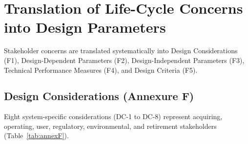 \section{Translation of Life-Cycle Concerns into Design Parameters}
\label{sec:F}

Stakeholder concerns are translated systematically into Design Considerations (F1), Design-Dependent Parameters (F2), Design-Independent Parameters (F3), Technical Performance Measures (F4), and Design Criteria (F5).

\subsection{Design Considerations (Annexure F)}
\label{subsec:F1}
Eight system-specific considerations (DC-1 to DC-8) represent acquiring, operating, user, regulatory, environmental, and retirement stakeholders (Table~\ref{tab:annexF}).

